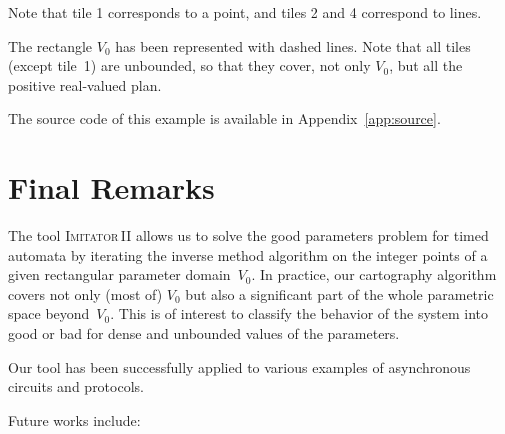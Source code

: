 \documentclass[a4paper,10pt]{article}
\newcommand{\imitatordeux}{\textsc{Imitator}\,II}
\begin{document}
Note that tile 1 corresponds to a point, and tiles 2 and 4 correspond to lines.

The rectangle $V_0$ has been represented with dashed lines.
Note that all tiles (except tile~1) are unbounded, so that they cover, not only $V_0$, but all the positive real-valued plan.


The source code of this example is available in Appendix~\ref{app:source}.


\section{Final Remarks} \label{sec:conclusion}

The tool \imitatordeux{} allows us to solve the good parameters problem for timed automata by iterating the inverse method algorithm on the integer points of a given rectangular parameter domain~$V_0$.
In practice, our cartography algorithm covers not only (most of) $V_0$ but also a significant part of the whole parametric space beyond~$V_0$.
This is of interest to classify the behavior of the system into good or bad for dense and unbounded values of the parameters.

Our tool has been successfully applied to various examples of asynchronous circuits and protocols.

Future works include:
\end{document}
